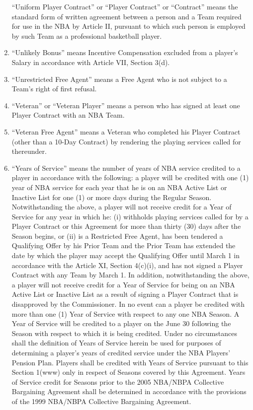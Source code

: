 \documentclass[
]{book}
\begin{document}
\begin{enumerate}
  ``Uniform Player Contract'' or ``Player Contract'' or ``Contract'' means the standard form of written agreement between a person and a Team required for use in the NBA by Article II, pursuant to which such person is employed by such Team as a professional basketball player.
\item
  ``Unlikely Bonus'' means Incentive Compensation excluded from a player's Salary in accordance with Article VII, Section 3(d).
\item
  ``Unrestricted Free Agent'' means a Free Agent who is not subject to a Team's right of first refusal.
\item
  ``Veteran'' or ``Veteran Player'' means a person who has signed at least one Player Contract with an NBA Team.
\item
  ``Veteran Free Agent'' means a Veteran who completed his Player Contract (other than a 10-Day Contract) by rendering the playing services called for thereunder.
\item
  ``Years of Service'' means the number of years of NBA service credited to a player in accordance with the following: a player will be credited with one (1) year of NBA service for each year that he is on an NBA Active List or Inactive List for one (1) or more days during the Regular Season. Notwithstanding the above, a player will not receive credit for a Year of Service for any year in which he: (i) withholds playing services called for by a Player Contract or this Agreement for more than thirty (30) days after the Season begins, or (ii) is a Restricted Free Agent, has been tendered a Qualifying Offer by his Prior Team and the Prior Team has extended the date by which the player may accept the Qualifying Offer until March 1 in accordance with the Article XI, Section 4(c)(i), and has not signed a Player Contract with any Team by March 1. In addition, notwithstanding the above, a player will not receive credit for a Year of Service for being on an NBA Active List or Inactive List as a result of signing a Player Contract that is disapproved by the Commissioner. In no event can a player be credited with more than one (1) Year of Service with respect to any one NBA Season. A Year of Service will be credited to a player on the June 30 following the Season with respect to which it is being credited. Under no circumstances shall the definition of Years of Service herein be used for purposes of determining a player's years of credited service under the NBA Players' Pension Plan. Players shall be credited with Years of Service pursuant to this Section 1(www) only in respect of Seasons covered by this Agreement. Years of Service credit for Seasons prior to the 2005 NBA/NBPA Collective Bargaining Agreement shall be determined in accordance with the provisions of the 1999 NBA/NBPA Collective Bargaining Agreement.
\end{enumerate}
\end{document}
